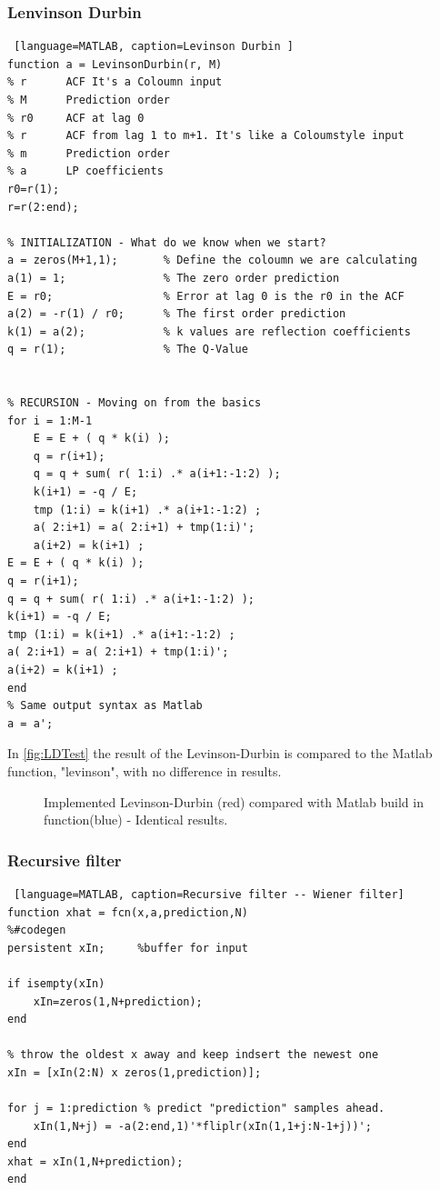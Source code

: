 \subsubsection{Lenvinson Durbin}
\begin{lstlisting} [language=MATLAB, caption=Levinson Durbin ]
function a = LevinsonDurbin(r, M)
% r      ACF It's a Coloumn input
% M      Prediction order
% r0     ACF at lag 0
% r      ACF from lag 1 to m+1. It's like a Coloumstyle input
% m      Prediction order
% a      LP coefficients
r0=r(1);
r=r(2:end);

% INITIALIZATION - What do we know when we start?
a = zeros(M+1,1);       % Define the coloumn we are calculating
a(1) = 1;               % The zero order prediction
E = r0;                 % Error at lag 0 is the r0 in the ACF
a(2) = -r(1) / r0;      % The first order prediction
k(1) = a(2);            % k values are reflection coefficients
q = r(1);               % The Q-Value


% RECURSION - Moving on from the basics
for i = 1:M-1
	E = E + ( q * k(i) );                   
	q = r(i+1);
	q = q + sum( r( 1:i) .* a(i+1:-1:2) );
	k(i+1) = -q / E;
	tmp (1:i) = k(i+1) .* a(i+1:-1:2) ;
	a( 2:i+1) = a( 2:i+1) + tmp(1:i)';
	a(i+2) = k(i+1) ;
E = E + ( q * k(i) );                   
q = r(i+1);
q = q + sum( r( 1:i) .* a(i+1:-1:2) );
k(i+1) = -q / E;
tmp (1:i) = k(i+1) .* a(i+1:-1:2) ;
a( 2:i+1) = a( 2:i+1) + tmp(1:i)';
a(i+2) = k(i+1) ;
end
% Same output syntax as Matlab
a = a';
\end{lstlisting}
In \autoref{fig:LDTest} the result of the Levinson-Durbin is compared to the Matlab function, "levinson", with no difference in results.   
\begin{figure}[H]
	\centering
	
	\caption{Implemented Levinson-Durbin (red) compared with Matlab build in function(blue) - Identical results.}
	\label{fig:LDTest}
\end{figure}

\subsubsection{Recursive filter}
\begin{lstlisting} [language=MATLAB, caption=Recursive filter -- Wiener filter]
function xhat = fcn(x,a,prediction,N)
%#codegen
persistent xIn;     %buffer for input

if isempty(xIn)
	xIn=zeros(1,N+prediction);
end

% throw the oldest x away and keep indsert the newest one
xIn = [xIn(2:N) x zeros(1,prediction)]; 

for j = 1:prediction % predict "prediction" samples ahead. 
	xIn(1,N+j) = -a(2:end,1)'*fliplr(xIn(1,1+j:N-1+j))';
end
xhat = xIn(1,N+prediction);
end
\end{lstlisting}

